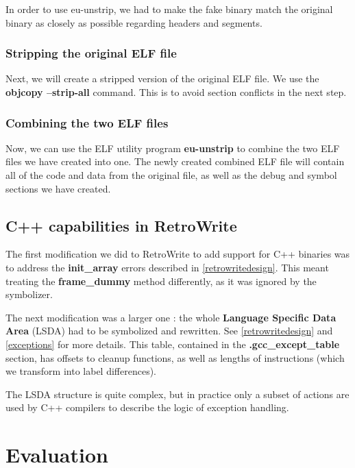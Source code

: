 \documentclass[a4paper,11pt,oneside]{report}
\begin{document}
In order to use eu-unstrip, we had to make the fake binary match the original
binary as closely as possible regarding headers and segments.

\subsection{Stripping the original ELF file}

Next, we will create a stripped version of the original ELF file.
We use the \textbf{objcopy --strip-all} command.
This is to avoid section conflicts in the next step.

\subsection{Combining the two ELF files}
\label{combiningelf}

Now, we can use the ELF utility program \textbf{eu-unstrip} to combine the two 
ELF files we have created into one.
The newly created combined ELF file will contain all of the code and data from 
the original file, as well as the debug and symbol sections we have created.


\section{C++ capabilities in RetroWrite}
\label{retrowriteimplementation}

The first modification we did to RetroWrite to add support for C++ binaries
was to address the \textbf{init\_array} errors described in
\autoref{retrowritedesign}.
This meant treating the \textbf{frame\_dummy} method differently, as it was
ignored by the symbolizer.

The next modification was a larger one : the whole \textbf{Language Specific
Data Area} (LSDA) had to be symbolized and rewritten.
See \autoref{retrowritedesign} and \autoref{exceptions} for more details.
This table, contained in the \textbf{.gcc\_except\_table} section, has offsets
to cleanup functions, as well as lengths of instructions (which we transform
into label differences).

The LSDA structure is quite complex, but in practice only a subset of actions
are used by C++ compilers to describe the logic of exception handling.

\chapter{Evaluation}
\label{evalchapter}
\end{document}
